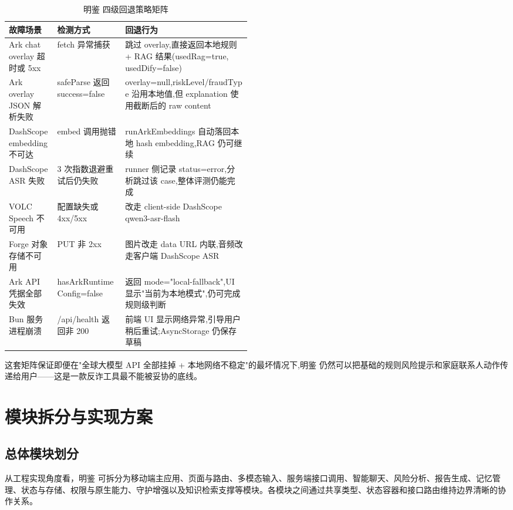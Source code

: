 \documentclass[UTF8,a4paper,12pt]{ctexart}
\begin{document}
\begin{table}[!htbp]
    \centering
    \caption{明鉴 四级回退策略矩阵}
    \label{tab:fallback-matrix}
    \renewcommand{\arraystretch}{1.4}
    \footnotesize
    \begin{tabularx}{\linewidth}{p{0.20\linewidth}p{0.28\linewidth}Y}
        \toprule
        故障场景 & 检测方式 & 回退行为 \\
        \midrule
        Ark chat overlay 超时或 5xx & fetch 异常捕获 & 跳过 overlay,直接返回本地规则 + RAG 结果(usedRag=true, usedDify=false) \\
        Ark overlay JSON 解析失败 & safeParse 返回 success=false & overlay=null,riskLevel/fraudType 沿用本地值,但 explanation 使用截断后的 raw content \\
        DashScope embedding 不可达 & embed 调用抛错 & runArkEmbeddings 自动落回本地 hash embedding,RAG 仍可继续 \\
        DashScope ASR 失败 & 3 次指数退避重试后仍失败 & runner 侧记录 status=error,分析跳过该 case,整体评测仍能完成 \\
        VOLC Speech 不可用 & 配置缺失或 4xx/5xx & 改走 client-side DashScope qwen3-asr-flash \\
        Forge 对象存储不可用 & PUT 非 2xx & 图片改走 data URL 内联,音频改走客户端 DashScope ASR \\
        Ark API 凭据全部失效 & hasArkRuntimeConfig=false & 返回 mode="local-fallback",UI 显示"当前为本地模式",仍可完成规则级判断 \\
        Bun 服务进程崩溃 & /api/health 返回非 200 & 前端 UI 显示网络异常,引导用户稍后重试;AsyncStorage 仍保存草稿 \\
        \bottomrule
    \end{tabularx}
\end{table}

这套矩阵保证即便在"全球大模型 API 全部挂掉 + 本地网络不稳定"的最坏情况下,明鉴 仍然可以把基础的规则风险提示和家庭联系人动作传递给用户——这是一款反诈工具最不能被妥协的底线。

\section{模块拆分与实现方案}

\subsection{总体模块划分}

从工程实现角度看，明鉴 可拆分为移动端主应用、页面与路由、多模态输入、服务端接口调用、智能聊天、风险分析、报告生成、记忆管理、状态与存储、权限与原生能力、守护增强以及知识检索支撑等模块。各模块之间通过共享类型、状态容器和接口路由维持边界清晰的协作关系。
\end{document}
